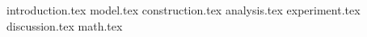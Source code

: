 {introduction.tex}
{model.tex}
{construction.tex}
{analysis.tex}
{experiment.tex}
{discussion.tex}
{math.tex}
